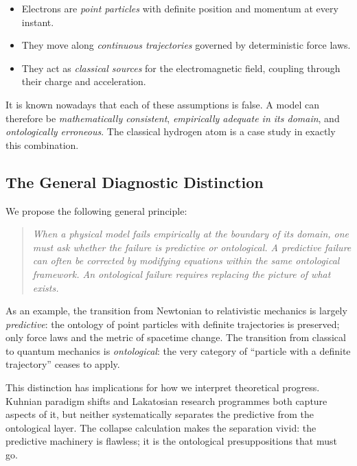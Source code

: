 \begin{itemize}
  \item Electrons are \textit{point particles} with definite position and
    momentum at every instant.
  \item They move along \textit{continuous trajectories} governed by
    deterministic force laws.
  \item They act as \textit{classical sources} for the electromagnetic
    field, coupling through their charge and acceleration.
\end{itemize}

It is known nowadays that each of these assumptions is false. A model can therefore be \textit{mathematically consistent}, \textit{empirically adequate in its domain}, and \textit{ontologically erroneous}. The classical hydrogen atom is a case study in exactly this combination.

\subsection{The General Diagnostic Distinction}
\label{subsection:distinction}

We propose the following general principle:

\begin{quote}
  \textit{When a physical model fails empirically at the boundary of its domain, one must ask whether the failure is predictive or ontological. A predictive failure can often be corrected by modifying equations within the same ontological framework. An ontological failure requires replacing the picture of what exists.}
\end{quote}

As an example, the transition from Newtonian to relativistic mechanics is largely \textit{predictive}: the ontology of point particles with definite trajectories is preserved; only force laws and the metric of spacetime change. The transition from classical to quantum mechanics is \textit{ontological}: the very category of ``particle with a definite trajectory'' ceases to apply.

\medskip

This distinction has implications for how we interpret theoretical progress. Kuhnian paradigm shifts \cite{kuhn_1962_structure} and Lakatosian research programmes \cite{lakatos_1978_methodology} both capture aspects of it, but neither systematically separates the predictive from the ontological layer. The collapse calculation makes the separation vivid: the predictive machinery is flawless; it is the ontological presuppositions that must go.

